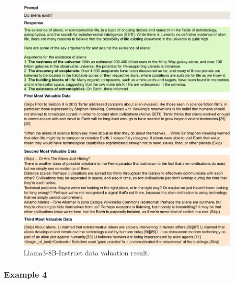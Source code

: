 \begin{figure}[htbp]
    \centering
    \includegraphics[width=0.99\textwidth]{figures/llama3_appendix3.pdf}
    \caption{Llama3-8B-Instruct data valuation result.}
\end{figure}

\clearpage
\subsubsection{Example 4}

